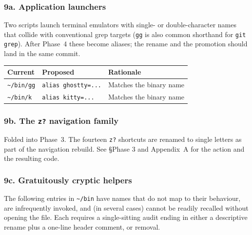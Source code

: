\documentclass[11pt,letterpaper]{scrartcl}
\begin{document}
\subsubsection*{9a. Application launchers}

Two scripts launch terminal emulators with single- or
double-character names that collide with conventional grep
targets (\texttt{gg} is also common shorthand for
\texttt{git grep}). After Phase~4 these become aliases; the
rename and the promotion should land in the same commit.

\begin{longtable}{@{}llp{2.7in}@{}}
  \toprule
  \textbf{Current} & \textbf{Proposed} & \textbf{Rationale} \\
  \midrule
  \texttt{\textasciitilde/bin/gg} & \texttt{alias ghostty=...} & Matches the binary name \\
  \texttt{\textasciitilde/bin/k}  & \texttt{alias kitty=...}   & Matches the binary name \\
  \bottomrule
\end{longtable}

\subsubsection*{9b. The \texttt{z?} navigation family}

Folded into Phase~3. The fourteen \texttt{z?} shortcuts are
renamed to single letters as part of the navigation rebuild. See
\S{}Phase 3 and Appendix~A for the action and the resulting code.

\subsubsection*{9c. Gratuitously cryptic helpers}

The following entries in \texttt{\textasciitilde/bin} have names
that do not map to their behaviour, are infrequently invoked,
and (in several cases) cannot be readily recalled without
opening the file. Each requires a single-sitting audit ending in
either a descriptive rename plus a one-line header comment, or
removal.
\end{document}
